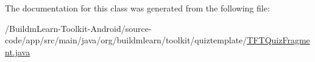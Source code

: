 The documentation for this class was generated from the following file\-:\begin{DoxyCompactItemize}
\item 
/\-Buildm\-Learn-\/\-Toolkit-\/\-Android/source-\/code/app/src/main/java/org/buildmlearn/toolkit/quiztemplate/\hyperlink{TFTQuizFragment_8java}{T\-F\-T\-Quiz\-Fragment.\-java}\end{DoxyCompactItemize}
